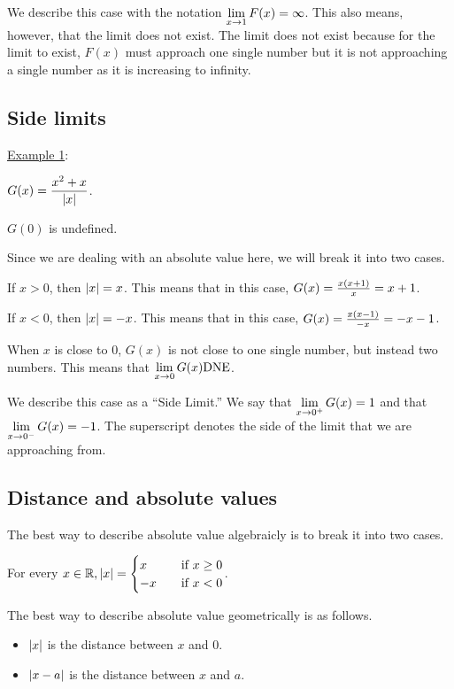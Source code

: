We describe this case with the notation \(\displaystyle \lim_{x \to 1} F(x) = \infty\). This also means, however, that the limit does not exist. The limit does not exist because for the limit to exist, \(F(x)\) must approach one single number but it is not approaching a single number as it is increasing to infinity.


\subsection{Side limits}

\underline{Example 1}:

\(\displaystyle G(x) = \frac{x^{2} + x}{\left|x\right|}\).

\(G(0)\) is undefined.

Since we are dealing with an absolute value here, we will break it into two cases.

If \(x > 0\), then \(\left|x\right| = x\). This means that in this case, \(G(x) = \frac{x \left(x + 1\right)}{x} = x + 1\).

If \(x < 0\), then \(\left|x\right| = -x\). This means that in this case, \(G(x) = \frac{x \left(x - 1\right)}{-x} = -x - 1\).


When \(x\) is close to \(0\), \(G(x)\) is not close to one single number, but instead two numbers. This means that \(\displaystyle \lim_{x \to 0} G(x) \text{DNE}\).

We describe this case as a ``Side Limit.'' We say that \(\displaystyle \lim_{x \to 0^{+}} G(x) = 1\) and that \(\displaystyle \lim_{x \to 0^{-}} G(x) = -1\). The superscript denotes the side of the limit that we are approaching from.

\subsection{Distance and absolute values}

The best way to describe absolute value algebraicly is to break it into two cases.

For every \(x \in \mathbb{R}, \left|x\right| = \begin{cases} x \quad & \text{if } x \geq 0 \\ -x \quad & \text{if } x < 0 \end{cases}\).

The best way to describe absolute value geometrically is as follows.

\begin{itemize}
  \item \(\left|x\right|\) is the distance between \(x\) and \(0\).
  \item \(\left|x - a\right|\) is the distance between \(x\) and \(a\).
\end{itemize}

